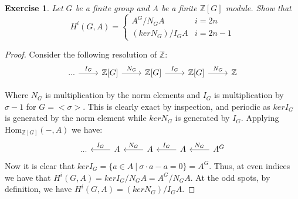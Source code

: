 \documentclass{article}
\newcommand{\Hom}{\text{Hom}}
\newcommand{\bb}[1]{\mathbb{#1}}
\newtheorem{exercise}{Exercise}
\begin{document}
\begin{exercise}
  Let $G$ be a finite group and A be a finite $\bb{Z}[G]$ module. Show that
  \[
    H^{i}(G, A) =
    \begin{cases}
      A^{G}/N_{G}A & i = 2n \\
      (ker N_{G})/I_{G}A & i = 2n-1
    \end{cases}
  \]
\end{exercise}
\begin{proof}
  Consider the following resolution of $\bb{Z}$:
  \[
    \begin{tikzcd}
... \arrow[r, "I_G"] & {\bb{Z}[G]} \arrow[r, "N_G"] & {\bb{Z}[G]} \arrow[r, "I_G"] & {\bb{Z}[G]} \arrow[r, "N_G"] & \bb{Z}
\end{tikzcd}
\]

Where $N_{G}$ is multiplication by the norm elements and $I_{G}$ is multiplication by $\sigma - 1$ for $G = < \sigma >$. This is clearly exact by inspection, and periodic as $kerI_{G}$ is generated by the norm element while $kerN_{G}$ is generated by $I_{G}$. Applying $\Hom_{\bb{Z}[G]}(-,A)$ we have:
\[
  \begin{tikzcd}
... & A \arrow[l, "I_G"'] & A \arrow[l, "N_G"'] & A \arrow[l, "I_G"'] & A^G \arrow[l, "N_G"']
\end{tikzcd}
\]
Now it is clear that $kerI_{G} = \{a \in A \ | \ \sigma \cdot a - a = 0 \} = A^{G}$. Thus, at even indices we have that $H^{i}(G, A) = kerI_{G}/N_{G}A = A^{G}/N_{G}A$. At the odd spots, by definition, we have $H^{i}(G,A) = (kerN_{G})/I_{G}A$.
\end{proof}
\end{document}
